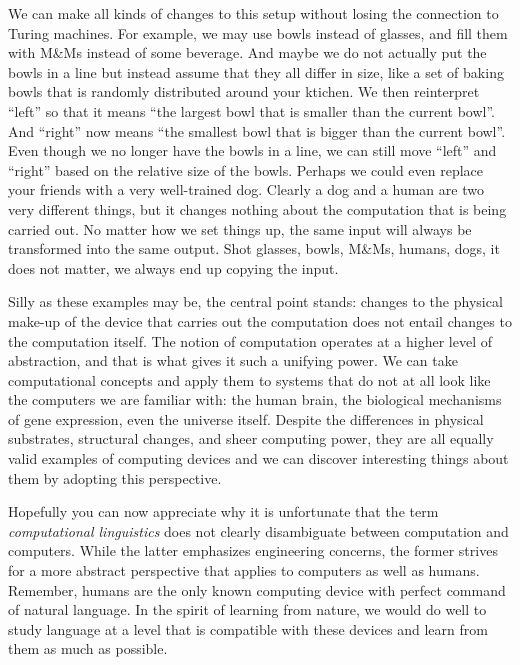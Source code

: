 We can make all kinds of changes to this setup without losing the connection to Turing machines.
For example, we may use bowls instead of glasses, and fill them with M\&Ms instead of some beverage.
And maybe we do not actually put the bowls in a line but instead assume that they all differ in size, like a set of baking bowls that is randomly distributed around your ktichen.
We then reinterpret ``left'' so that it means ``the largest bowl that is smaller than the current bowl''.
And ``right'' now means ``the smallest bowl that is bigger than the current bowl''.
Even though we no longer have the bowls in a line, we can still move ``left'' and ``right'' based on the relative size of the bowls.
Perhaps we could even replace your friends with a very well-trained dog.
Clearly a dog and a human are two very different things, but it changes nothing about the computation that is being carried out.
No matter how we set things up, the same input will always be transformed into the same output.
Shot glasses, bowls, M\&Ms, humans, dogs, it does not matter, we always end up copying the input.

Silly as these examples may be, the central point stands: changes to the physical make-up of the device that carries out the computation does not entail changes to the computation itself.
The notion of computation operates at a higher level of abstraction, and that is what gives it such a unifying power.
We can take computational concepts and apply them to systems that do not at all look like the computers we are familiar with: the human brain, the biological mechanisms of gene expression, even the universe itself.
Despite the differences in physical substrates, structural changes, and sheer computing power, they are all equally valid examples of computing devices and we can  discover interesting things about them by adopting this perspective.

Hopefully you can now appreciate why it is unfortunate that the term \emph{computational linguistics} does not clearly disambiguate between computation and computers.
While the latter emphasizes engineering concerns, the former strives for a more abstract perspective that applies to computers as well as humans.
Remember, humans are the only known computing device with perfect command of natural language.
In the spirit of learning from nature, we would do well to study language at a level that is compatible with these devices and learn from them as much as possible.

